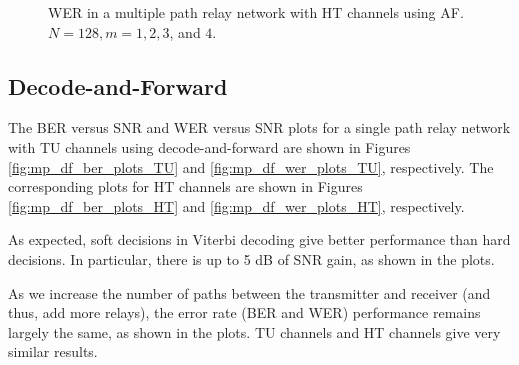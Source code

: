 \begin{figure}
{}
\caption{WER in a multiple path relay network with HT channels using AF.  $N = 128, m = 1, 2, 3$, and $4$.}
\label{fig:mp_af_wer_plots_HT}
\end{figure}

\subsection{Decode-and-Forward}
\label{subsec:mp_bws_df}

The BER versus SNR and WER versus SNR plots for a single path relay network with TU channels using decode-and-forward are shown in Figures \ref{fig:mp_df_ber_plots_TU} and \ref{fig:mp_df_wer_plots_TU}, respectively.  The corresponding plots for HT channels are shown in Figures \ref{fig:mp_df_ber_plots_HT} and \ref{fig:mp_df_wer_plots_HT}, respectively.

As expected, soft decisions in Viterbi decoding give better performance than hard decisions.  In particular, there is up to 5 dB of SNR gain, as shown in the plots.

As we increase the number of paths between the transmitter and receiver (and thus, add more relays), the error rate (BER and WER) performance remains largely the same, as shown in the plots.  TU channels and HT channels give very similar results.



